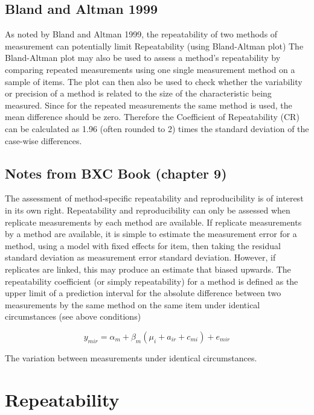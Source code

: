 \documentclass[12pt, a4paper]{article}
\begin{document}
\subsection{Bland and Altman 1999}
As noted by Bland and Altman 1999, the repeatability of two methods of measurement can  potentially limit
Repeatability (using Bland-Altman plot)
The Bland-Altman plot may also be used to assess a method’s repeatability by comparing repeated measurements using one single measurement method on a sample of items.
The plot can then also be used to check whether the variability or precision of a method is related to the size of the characteristic being measured.
Since for the repeated measurements the same method is used, the mean difference should be zero.
Therefore the Coefficient of Repeatability (CR) can be calculated as 1.96 (often rounded to 2) times the standard deviation of the case-wise differences.

\subsection{Notes from BXC Book (chapter 9)}
The assessment of method-specific repeatability and reproducibility is of interest in its own right.
Repeatability and reproducibility can only be assessed when replicate measurements by each method are available.
If replicate measurements by a method are available, it is simple to estimate the measurement error for a method, using a model with fixed effects for item, then taking the residual standard deviation as measurement error standard deviation.
However, if replicates are linked, this may produce an estimate that biased upwards.
The repeatability coefficient (or simply repeatability) for a method is defined as the upper limit of a
prediction interval for the absolute difference between two measurements by the same method on the same
item under identical circumstances (see above conditions)

\[y_{mir}  = \alpha_{m} + \beta_m( \mu_i + a_{ir} + c_{mi}) + e_{mir}\]

The variation between measurements under identical circumstances.


\newpage
\section{Repeatability}
\end{document}
